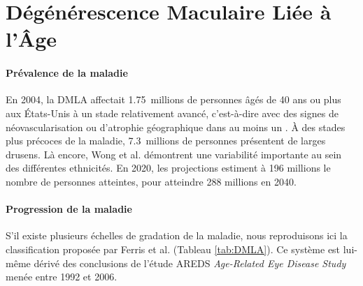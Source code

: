 \section{Dégénérescence Maculaire Liée à l'Âge}
\paragraph{Prévalence de la maladie}
En 2004, la \ac{DMLA} affectait \SI{1.75}{millions} de personnes âgés de 40 ans ou plus aux États-Unis à un stade relativement avancé, c'est-à-dire avec des signes de néovascularisation ou d'atrophie géographique dans au moins un \oeil. À des stades plus précoces de la maladie, \SI{7.3}{millions} de personnes présentent de larges drusens. Là encore, Wong et al.\cite{wongGlobalPrevalenceAgerelated2014} démontrent une variabilité importante au sein des différentes ethnicités. En 2020, les projections estiment à 196 millions le nombre de personnes atteintes, pour atteindre 288 millions en 2040.
\paragraph{Progression de la maladie}
S'il existe plusieurs échelles de gradation de la maladie, nous reproduisons ici la classification proposée par Ferris et al. \cite{ferrisClinicalClassificationAgerelated2013a} (Tableau \ref{tab:DMLA}). Ce système est lui-même dérivé des conclusions de l'étude AREDS \textit{Age-Related Eye Disease Study} menée entre 1992 et 2006.



